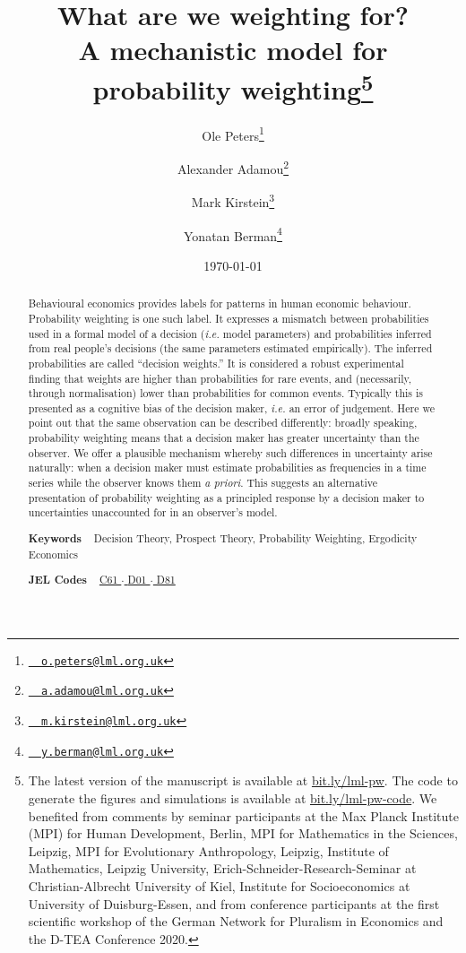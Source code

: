 \documentclass[a4paper, 12pt]{article}
\title{What are we weighting for? \\
{\normalsize A mechanistic model for probability weighting\thanks{The latest version of the manuscript is available at \href{https://bit.ly/lml-pw}{bit.ly/lml-pw}. The code to generate the figures and simulations is available at \href{https://bit.ly/lml-pw-code}{bit.ly/lml-pw-code}.
We benefited from comments by seminar participants at
the Max Planck Institute (MPI) for Human Development, Berlin,
MPI for Mathematics in the Sciences, Leipzig,
MPI for Evolutionary Anthropology, Leipzig,
Institute of Mathematics, Leipzig University,
Erich-Schneider-Research-Seminar at Christian-Albrecht University of Kiel,
Institute for Socioeconomics at University of Duisburg-Essen,
and from conference participants at
the first scientific workshop of the German Network for Pluralism in Economics
and the D-TEA Conference 2020.}}}
\author[1,2]{Ole Peters\thanks{\texttt{\href{mailto:o.peters@lml.org.uk}{~\Letter~o.peters@lml.org.uk}}}}
\author[1]{Alexander Adamou\thanks{\texttt{\href{mailto:a.adamou@lml.org.uk}{~\Letter~a.adamou@lml.org.uk}}}}
\author[1,3,4]{Mark Kirstein\thanks{\texttt{\href{mailto:m.kirstein@lml.org.uk}{~\Letter~m.kirstein@lml.org.uk}}}}
\author[1]{Yonatan Berman\thanks{\texttt{\href{mailto:y.berman@lml.org.uk}{~\Letter~y.berman@lml.org.uk}}}}
\affil[1]{London Mathematical Laboratory, UK} %
\affil[2]{Santa Fe Institute, NM, USA} %
\affil[3]{Max-Planck-Institute for Mathematics in the Sciences, Leipzig, Germany} %
\affil[4]{Institute of Mathematics, Leipzig University, Germany} %
\date{\today}
\newcommand{\ie}{\textit{i.e.}\xspace}
\begin{document}
\begin{titlepage}
	\maketitle
\thispagestyle{fancy}

\begin{abstract}
\noindent 
Behavioural economics provides labels for patterns in human economic behaviour. Probability weighting is one such label. It expresses a mismatch between probabilities used in a formal model of a decision (\ie model parameters) and probabilities inferred from real people's decisions (the same parameters estimated empirically).
The inferred probabilities are called ``decision weights.'' It is considered a robust experimental finding that weights are higher than probabilities for rare events, and (necessarily, through normalisation) lower than probabilities for common events.
Typically this is presented as a cognitive bias of  the decision maker, \ie an error of judgement.
Here we point out that the same observation can be described differently: broadly speaking, probability weighting means that a decision maker has greater uncertainty than the observer.
We offer a plausible mechanism whereby such differences in uncertainty arise naturally: when a decision maker must estimate probabilities as frequencies in a time series while the observer knows them \textit{a priori}.
This suggests an alternative presentation of probability weighting as a principled response by a decision maker to uncertainties unaccounted for in an observer's model.
\vspace{1em}

\noindent\textsf{\textbf{Keywords}} ~ Decision Theory, Prospect Theory, Probability Weighting, Ergodicity Economics
\vspace{.5em}

\noindent\textsf{\textbf{JEL Codes}} ~
\href{https://www.aeaweb.org/econlit/jelCodes.php?view=jel#C}{%
C61		%
$\cdot$
}%
\href{https://www.aeaweb.org/econlit/jelCodes.php?view=jel#D}{%
D01 	%
$\cdot$
D81 	%
}
\end{abstract}
\end{titlepage}
 
\setcounter{page}{2}		%
\end{document}
